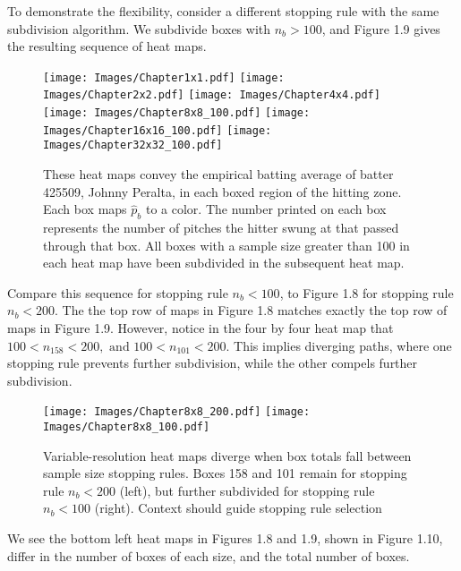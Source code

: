 To demonstrate the flexibility, consider a different stopping rule with the same subdivision algorithm. We subdivide boxes with $n_{b} > 100$, and Figure 1.9 gives the resulting sequence of heat maps.
        \begin{figure}[H]
      	\centering
      	\texttt{[image: Images/Chapter1x1.pdf]}
      	\texttt{[image: Images/Chapter2x2.pdf]}
      	\texttt{[image: Images/Chapter4x4.pdf]}
      	\texttt{[image: Images/Chapter8x8\_100.pdf]}
      	\texttt{[image: Images/Chapter16x16\_100.pdf]}
      	\texttt{[image: Images/Chapter32x32\_100.pdf]}
      	\caption{These heat maps convey the empirical batting average of batter 425509, Johnny Peralta, in each boxed region of the hitting zone. Each box maps $\hat{p}_{b}$ to a color. The number printed on each box represents the number of pitches the hitter swung at that passed through that box. All boxes with a sample size greater than 100 in each heat map have been subdivided in the subsequent heat map.}
\end{figure} 	
Compare this sequence for stopping rule $n_{b} < 100$, to Figure 1.8 for stopping rule $n_{b} < 200$. The the top row of maps in Figure 1.8 matches exactly the top row of maps in Figure 1.9. However, notice in the four by four heat map that $100 < n_{158} < 200, \text{ and } 100 < n_{101} < 200$. This implies diverging paths, where one stopping rule prevents further subdivision, while the other compels further subdivision.
        \begin{figure}[H]
      	\centering      
      	\texttt{[image: Images/Chapter8x8\_200.pdf]}
      	\texttt{[image: Images/Chapter8x8\_100.pdf]}
      	\caption{Variable-resolution heat maps diverge when box totals fall between sample size stopping rules. Boxes 158 and 101 remain for stopping rule $n_{b} < 200$ (left), but further subdivided for stopping rule $n_{b} < 100$ (right). Context should guide stopping rule selection}
\end{figure} 
We see the bottom left heat maps in Figures 1.8 and 1.9, shown in Figure 1.10, differ in the number of boxes of each size, and the total number of boxes. 

